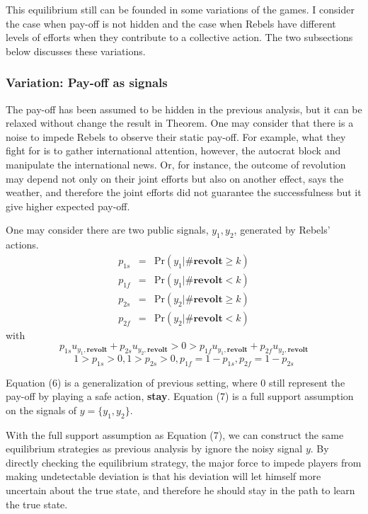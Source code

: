 \documentclass[12pt,letter]{article}
\theoremstyle{definition}
\theoremstyle{remark}
\theoremstyle{claim}
\begin{document}
This equilibrium still can be founded in some variations of the games. I consider the case when pay-off is not hidden and the case when Rebels have different levels of efforts when they contribute to a collective action. The two subsections below discusses these variations.

\subsubsection{Variation: Pay-off as signals}
The pay-off has been assumed to be hidden in the previous analysis, but it can be relaxed without change the result in Theorem. One may consider that there is a noise to impede Rebels to observe their static pay-off. For example, what they fight for is to gather international attention, however, the autocrat block and manipulate the international news. Or, for instance, the outcome of revolution may depend not only on their joint efforts but also on another effect, says the weather, and therefore the joint efforts did not guarantee the successfulness but it give higher expected pay-off. 

One may consider there are two public signals, $y_1,y_2$, generated by Rebels' actions.
\begin{eqnarray*}
p_{1s} &=& \mathrm {Pr}(y_1|\#\textbf{revolt}\geq k) \\
p_{1f} &=& \mathrm {Pr}(y_1|\#\textbf{revolt}< k) \\
p_{2s} &=& \mathrm {Pr}(y_2|\#\textbf{revolt}\geq k) \\
p_{2f} &=& \mathrm {Pr}(y_2|\#\textbf{revolt}< k) 
\end{eqnarray*}
with
\begin{equation}
p_{1s}u_{y_1,\textbf{revolt}}+p_{2s}u_{y_2,\textbf{revolt}}>0>p_{1f}u_{y_1,\textbf{revolt}}+p_{2f}u_{y_2,\textbf{revolt}}
\end{equation}
\begin{equation}
1>p_{1s}>0,1>p_{2s}>0,p_{1f}=1-p_{1s},p_{2f}=1-p_{2s}
\end{equation}

Equation (6) is a generalization of previous setting, where $0$ still represent the pay-off by playing a safe action, \textbf{stay}. Equation (7) is a full support assumption on the signals of $y=\{y_1,y_2\}$.

With the full support assumption as Equation (7), we can construct the same equilibrium strategies as previous analysis by ignore the noisy signal $y$. By directly checking the equilibrium strategy, the major force to impede players from making undetectable deviation is that his deviation will let himself more uncertain about the true state, and therefore he should stay in the path to learn the true state. 
\end{document}
